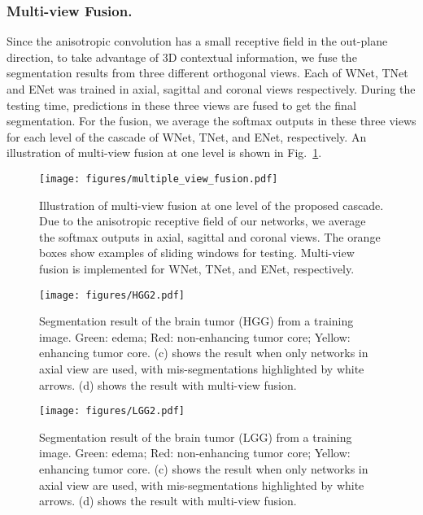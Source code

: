 \documentclass[a4paper,orivec,runningheads]{llncs}
\begin{document}
\subsubsection{Multi-view Fusion.}
Since the anisotropic convolution has a small receptive field in the out-plane direction, to take advantage of 3D contextual information, we fuse the segmentation results from three different orthogonal views. Each of WNet, TNet and ENet was trained in axial, sagittal and coronal views respectively. During the testing time, predictions in these three views are fused to get the final segmentation. For the fusion, we average the softmax outputs in these three views for each level of the cascade of WNet, TNet, and ENet, respectively. An illustration of multi-view fusion at one level is shown in Fig.~\ref{fig:fusion}.
\begin{figure}[t]
	\centering
	\texttt{[image: figures/multiple\_view\_fusion.pdf]}
	\caption[anisotropic network]{
		Illustration of multi-view fusion at one level of the proposed cascade. Due to the anisotropic receptive field of our networks, we average the softmax outputs in axial, sagittal and coronal views. The orange boxes show examples of sliding windows for testing. Multi-view fusion is implemented for WNet, TNet, and ENet, respectively.
	}
	\label{fig:fusion}
\end{figure}

\begin{figure}[t]
	\centering
	\texttt{[image: figures/HGG2.pdf]}
	\caption[Segmentation result of the brain tumor (HGG) from a training image.]{
		Segmentation result of the brain tumor (HGG) from a training image. Green: edema; Red: non-enhancing tumor core; Yellow: enhancing tumor core. (c) shows the result when only networks in axial view are used, with mis-segmentations highlighted by white arrows. (d) shows the result with multi-view fusion.
	}
	\label{fig:hgg}
\end{figure}
\begin{figure}[t]
	\centering
	\texttt{[image: figures/LGG2.pdf]}
	\caption[Segmentation result of the brain tumor (LGG) from a training image]{
		Segmentation result of the brain tumor (LGG) from a training image. Green: edema; Red: non-enhancing tumor core; Yellow: enhancing tumor core. (c) shows the result when only networks in axial view are used, with mis-segmentations highlighted by white arrows. (d) shows the result with multi-view fusion.
	}
	\label{fig:lgg}
\end{figure}
\end{document}
